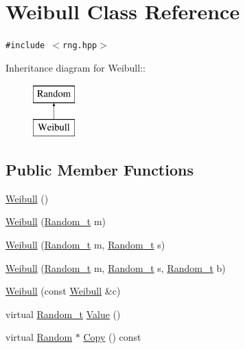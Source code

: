 \hypertarget{classWeibull}{
\section{Weibull Class Reference}
\label{classWeibull}
}
{\tt \#include $<$rng.hpp$>$}

Inheritance diagram for Weibull::\begin{figure}[H]
\begin{center}
\leavevmode
\includegraphics[height=2cm]{classWeibull}
\end{center}
\end{figure}
\subsection*{Public Member Functions}
\begin{CompactItemize}
\item 
\hyperlink{classWeibull_1ef56bcb370b049213cff29e69a56cbb}{Weibull} ()
\item 
\hyperlink{classWeibull_87b112d5cdec757dfdc6536f7f0f5967}{Weibull} (\hyperlink{rng_8hpp_ad41e7f5d86b1109b6a6a032c86cdd3f}{Random\_\-t} m)
\item 
\hyperlink{classWeibull_98abce0e27e7b59e95279624e2e4329f}{Weibull} (\hyperlink{rng_8hpp_ad41e7f5d86b1109b6a6a032c86cdd3f}{Random\_\-t} m, \hyperlink{rng_8hpp_ad41e7f5d86b1109b6a6a032c86cdd3f}{Random\_\-t} s)
\item 
\hyperlink{classWeibull_36854546a5299757bd15400317568955}{Weibull} (\hyperlink{rng_8hpp_ad41e7f5d86b1109b6a6a032c86cdd3f}{Random\_\-t} m, \hyperlink{rng_8hpp_ad41e7f5d86b1109b6a6a032c86cdd3f}{Random\_\-t} s, \hyperlink{rng_8hpp_ad41e7f5d86b1109b6a6a032c86cdd3f}{Random\_\-t} b)
\item 
\hyperlink{classWeibull_e61f13f2e95121364019b9e542847129}{Weibull} (const \hyperlink{classWeibull}{Weibull} \&c)
\item 
virtual \hyperlink{rng_8hpp_ad41e7f5d86b1109b6a6a032c86cdd3f}{Random\_\-t} \hyperlink{classWeibull_1c4aeb6b0efae805a5ae36b072a8f4c6}{Value} ()
\item 
virtual \hyperlink{classRandom}{Random} $\ast$ \hyperlink{classWeibull_2a82af828e7ba08035de1d326f714afa}{Copy} () const 
\end{CompactItemize}


